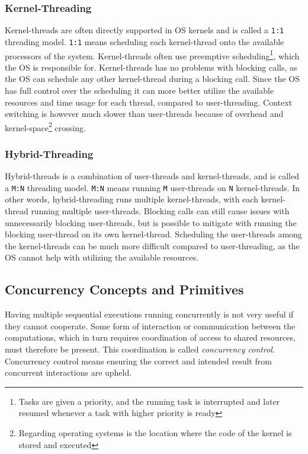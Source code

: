 \subsubsection{Kernel-Threading}

Kernel-threads are often directly supported in OS kernels and is called a \texttt{1:1} threading model. \texttt{1:1} means scheduling each kernel-thread onto the available processors of the system. Kernel-threads often use preemptive scheduling\footnote{Tasks are given a priority, and the running task is interrupted and later resumed whenever a task with higher priority is ready}, which the OS is responsible for. Kernel-threads has no problems with blocking calls, as the OS can schedule any other kernel-thread during a blocking call. Since the OS has full control over the scheduling it can more better utilize the available resources and time usage for each thread, compared to user-threading. Context switching is however much slower than user-threads because of overhead and kernel-space\footnote{Regarding operating systems is the location where the code of the kernel is stored and executed} crossing.


\subsubsection{Hybrid-Threading}

Hybrid-threads is a combination of user-threads and kernel-threads, and is called a \texttt{M:N} threading model. \texttt{M:N} means running \texttt{M} user-threads on \texttt{N} kernel-threads. In other words, hybrid-threading runs multiple kernel-threads, with each kernel-thread running multiple user-threads. Blocking calls can still cause issues with unnecessarily blocking user-threads, but is possible to mitigate with running the blocking user-thread on its own kernel-thread. Scheduling the user-threads among the kernel-threads can be much more difficult compared to user-threading, as the OS cannot help with utilizing the available resources. 


\subsection{Concurrency Concepts and Primitives}
\label{subsec:concurrency_concepts_primitives}

Having multiple sequential executions running concurrently is not very useful if they cannot cooperate. Some form of interaction or communication between the computations, which in turn requires coordination of access to shared resources, must therefore be present. This coordination is called \textit{concurrency control}. Concurrency control means ensuring the correct and intended result from concurrent interactions are upheld. 

